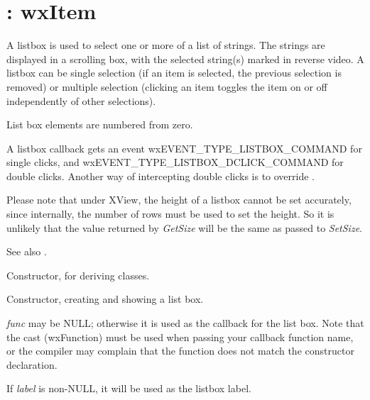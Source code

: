 \section{: wxItem}\label{wxlistbox}

A listbox is used to select one or more of a list of strings. The
strings are displayed in a scrolling box, with the selected string(s)
marked in reverse video. A listbox can be single selection (if an item
is selected, the previous selection is removed) or multiple selection
(clicking an item toggles the item on or off independently of other
selections).

List box elements are numbered from zero.

A listbox callback gets an event wxEVENT\_TYPE\_LISTBOX\_COMMAND for single clicks, and
wxEVENT\_TYPE\_LISTBOX\_DCLICK\_COMMAND for double clicks. Another way of intercepting
double clicks is to override .

Please note that under XView, the height of a listbox cannot be set
accurately, since internally, the number of rows must be used to set
the height. So it is unlikely that the value returned by {\it GetSize} will
be the same as passed to {\it SetSize}.

See also .

\label{constrlistbox}


Constructor, for deriving classes.


Constructor, creating and showing a list box.

{\it func} may be NULL; otherwise it is used as the callback for the
list box.  Note that the cast (wxFunction) must be used when passing
your callback function name, or the compiler may complain that the
function does not match the constructor declaration.

If {\it label} is non-NULL, it will be used as the listbox label.


